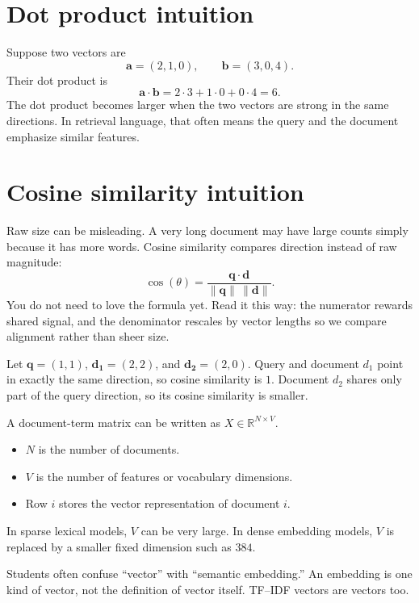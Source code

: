 \documentclass[11pt,oneside]{report}
\newcommand{\vect}[1]{\mathbf{#1}}
\begin{document}
\section*{Dot product intuition}
Suppose two vectors are
\[
\vect{a}=(2,1,0), \qquad \vect{b}=(3,0,4).
\]
Their dot product is
\[
\vect{a}\cdot\vect{b}=2\cdot 3 + 1\cdot 0 + 0\cdot 4 = 6.
\]
The dot product becomes larger when the two vectors are strong in the same directions. In retrieval language, that often means the query and the document emphasize similar features.

\section*{Cosine similarity intuition}
Raw size can be misleading. A very long document may have large counts simply because it has more words. Cosine similarity compares direction instead of raw magnitude:
\[
\cos(\theta)=\frac{\vect{q}\cdot\vect{d}}{\|\vect{q}\|\,\|\vect{d}\|}.
\]
You do not need to love the formula yet. Read it this way: the numerator rewards shared signal, and the denominator rescales by vector lengths so we compare alignment rather than sheer size.

\begin{examplebox}
Let $\vect{q}=(1,1)$, $\vect{d_1}=(2,2)$, and $\vect{d_2}=(2,0)$. Query and document $d_1$ point in exactly the same direction, so cosine similarity is $1$. Document $d_2$ shares only part of the query direction, so its cosine similarity is smaller.
\end{examplebox}

\begin{formulabox}
A document-term matrix can be written as $X\in\mathbb{R}^{N\times V}$.
\begin{itemize}
\item $N$ is the number of documents.
\item $V$ is the number of features or vocabulary dimensions.
\item Row $i$ stores the vector representation of document $i$.
\end{itemize}
In sparse lexical models, $V$ can be very large. In dense embedding models, $V$ is replaced by a smaller fixed dimension such as $384$.
\end{formulabox}

\begin{warningbox}
Students often confuse ``vector'' with ``semantic embedding.'' An embedding is one kind of vector, not the definition of vector itself. TF--IDF vectors are vectors too.
\end{warningbox}
\end{document}
